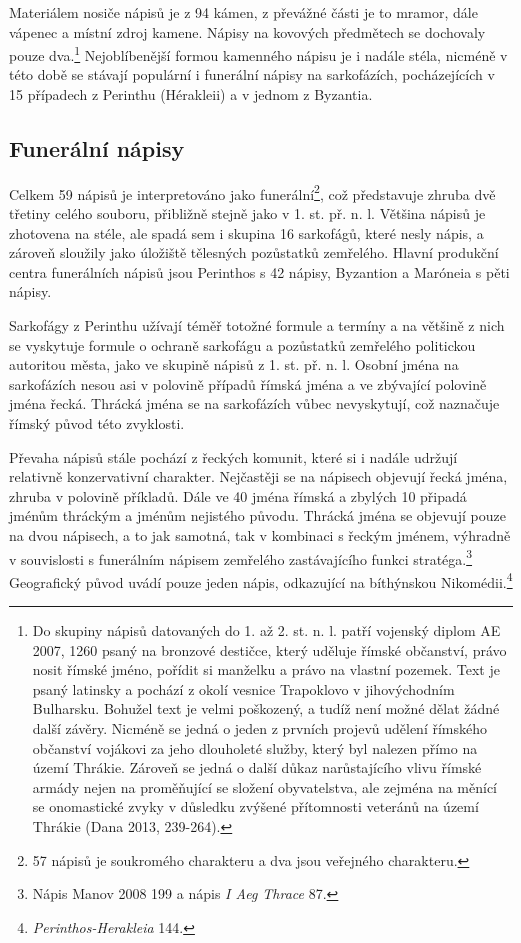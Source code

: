Materiálem nosiče nápisů je z 94  kámen, z převážné části je to mramor, dále vápenec a místní zdroj kamene. Nápisy na kovových předmětech se dochovaly pouze dva.\footnote{Do skupiny nápisů datovaných do 1. až 2. st. n. l. patří vojenský diplom AE 2007, 1260 psaný na bronzové destičce, který uděluje římské občanství, právo nosit římské jméno, pořídit si manželku a právo na vlastní pozemek. Text je psaný latinsky a pochází z okolí vesnice Trapoklovo v jihovýchodním Bulharsku. Bohužel text je velmi poškozený, a tudíž není možné dělat žádné další závěry. Nicméně se jedná o jeden z prvních projevů udělení římského občanství vojákovi za jeho dlouholeté služby, který byl nalezen přímo na území Thrákie. Zároveň se jedná o další důkaz narůstajícího vlivu římské armády nejen na proměňující se složení obyvatelstva, ale zejména na měnící se onomastické zvyky v důsledku zvýšené přítomnosti veteránů na území Thrákie (Dana 2013, 239-264).} Nejoblíbenější formou kamenného nápisu je i nadále stéla, nicméně v této době se stávají populární i funerální nápisy na sarkofázích, pocházejících v 15 případech z Perinthu (Hérakleii) a v jednom z Byzantia.

\subsection[funerální-nápisy-12]{Funerální nápisy}

Celkem 59 nápisů je interpretováno jako funerální\footnote{57 nápisů je soukromého charakteru a dva jsou veřejného charakteru.}, což představuje zhruba dvě třetiny celého souboru, přibližně stejně jako v 1. st. př. n. l. Většina nápisů je zhotovena na stéle, ale spadá sem i skupina 16 sarkofágů, které nesly nápis, a zároveň sloužily jako úložiště tělesných pozůstatků zemřelého. Hlavní produkční centra funerálních nápisů jsou Perinthos s 42 nápisy, Byzantion a Maróneia s pěti nápisy.

Sarkofágy z Perinthu užívají téměř totožné formule a termíny a na většině z nich se vyskytuje formule o ochraně sarkofágu a pozůstatků zemřelého politickou autoritou města, jako ve skupině nápisů z 1. st. př. n. l. Osobní jména na sarkofázích nesou asi v polovině případů římská jména a ve zbývající polovině jména řecká. Thrácká jména se na sarkofázích vůbec nevyskytují, což naznačuje římský původ této zvyklosti.

Převaha nápisů stále pochází z řeckých komunit, které si i nadále udržují relativně konzervativní charakter. Nejčastěji se na nápisech objevují řecká jména, zhruba v polovině příkladů. Dále ve 40  jména římská a zbylých 10  připadá jménům thráckým a jménům nejistého původu. Thrácká jména se objevují pouze na dvou nápisech, a to jak samotná, tak v kombinaci s řeckým jménem, výhradně v souvislosti s funerálním nápisem zemřelého zastávajícího funkci stratéga.\footnote{Nápis Manov 2008 199 a nápis {\em I Aeg Thrace} 87.} Geografický původ uvádí pouze jeden nápis, odkazující na bíthýnskou Nikomédii.\footnote{{\em Perinthos-Herakleia} 144.}

